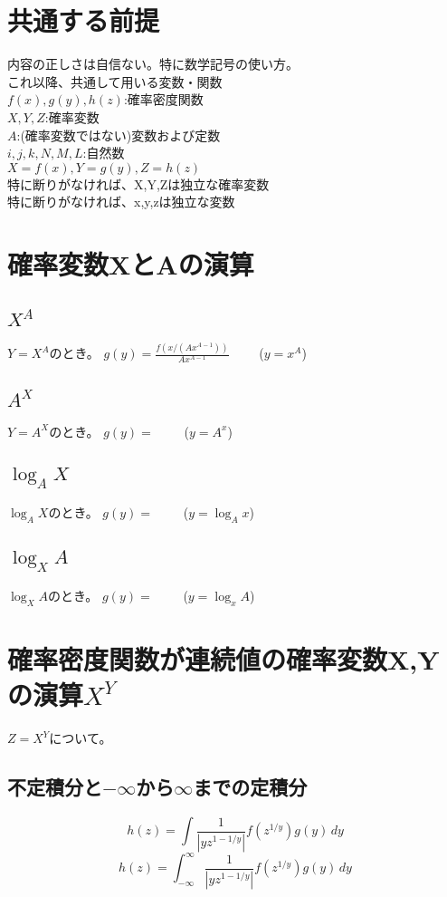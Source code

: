\documentclass[a4paper,11pt]{ltjsarticle}
\begin{document}
\tableofcontents
\newpage



\section{共通する前提}
内容の正しさは自信ない。特に数学記号の使い方。\\

これ以降、共通して用いる変数・関数\\
$f(x), g(y), h(z)$:確率密度関数\\
$X, Y, Z$:確率変数\\
$A$:(確率変数ではない)変数および定数\\
$i,j,k,N,M,L$:自然数\\
$X=f(x), Y=g(y), Z=h(z)$\\
特に断りがなければ、X,Y,Zは独立な確率変数\\
特に断りがなければ、x,y,zは独立な変数
\newpage


\section{確率変数XとAの演算}
\subsection{$X^A$}
$Y=X^A$のとき。%
$g(y) = \frac{f(x/(Ax^{A-1}))}{Ax^{A-1}}$
\ \ \ \ ($y=x^A$)
\subsection{$A^X$}
$Y=A^X$のとき。
$g(y) = $
\ \ \ \ ($y=A^x$)
\subsection{$\log_AX$}
$\log_AX$のとき。
$g(y) = $
\ \ \ \ ($y=\log_Ax$)
\subsection{$\log_XA$}
$\log_XA$のとき。
$g(y) = $
\ \ \ \ ($y=\log_xA$)
\newpage

\section{確率密度関数が連続値の確率変数X,Yの演算$X^Y$}
$Z=X^Y$について。
\subsection{不定積分と$-\infty$から$\infty$までの定積分}
$$
    h(z) = \int \frac{1}{|yz^{1-1/y}|} f(z^{1/y}) g(y) \, dy
$$
$$
    h(z) = \int_{-\infty}^{\infty} \frac{1}{|yz^{1-1/y}|} f(z^{1/y}) g(y) \, dy
$$
\end{document}
